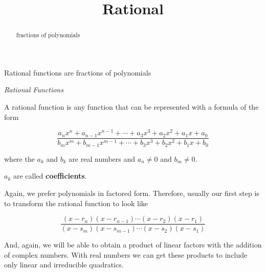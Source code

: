 \documentclass{ximera}
\title{Rational}
\begin{document}
\begin{abstract}
fractions of polynomials
\end{abstract}
\maketitle




Rational functions are fractions of polynomials


\begin{definition} \textit{Rational Functions}

A rational function is any function that can be represented with a formula of the form

\[   \frac{ a_n x^n + a_{n-1} x^{n-1} + \cdots + a_3 x^3 + a_2 x^2 + a_1 x + a_0  } { b_m x^m + b_{m-1} x^{m-1} + \cdots + b_3 x^3 + b_2 x^2 + b_1 x + b_0 }   \]



where the $a_k$ and $b_k$ are real numbers and $a_n \ne 0$ and $b_m \ne 0$.

$a_k$ are called \textbf{coefficients}.



\end{definition}




Again, we prefer polynomials in factored form.  Therefore, usually our first step is to transform the rational function to look like



\[   \frac{ (x-r_n)(x-r_{n-1})  \cdots (x-r_2)(x-r_1)  } { (x-s_m)(x-s_{m-1})  \cdots (x-s_2)(x-s_1) }   \]




And, again, we will be able to obtain a product of linear factors with the addition of complex numbers.  With real numbers we can get these products to include only linear and irreducible quadratics.
\end{document}
